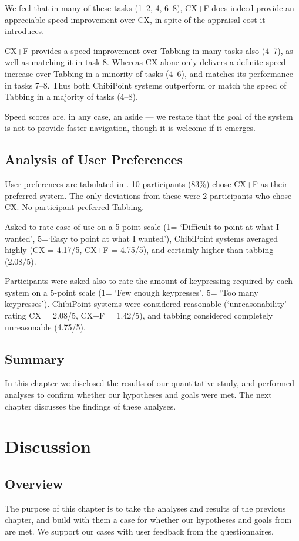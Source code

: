 \documentclass[11pt,openright,a4paper]{report}
\begin{document}
We feel that in many of these tasks (1--2, 4, 6--8), CX+F does indeed provide an appreciable speed improvement over CX, in spite of the appraisal cost it introduces.

CX+F provides a speed improvement over Tabbing in many tasks also (4--7), as well as matching it in task 8. Whereas CX alone only delivers a definite speed increase over Tabbing in a minority of tasks (4--6), and matches its performance in tasks 7--8. Thus both ChibiPoint systems outperform or match the speed of Tabbing in a majority of tasks (4--8).

Speed scores are, in any case, an aside --- we restate that the goal of the system is not to provide faster navigation, though it is welcome if it emerges.

\section{Analysis of User Preferences}
\label{sec:userpref}
User preferences are tabulated in . 10 participants (83\%) chose CX+F as their preferred system. The only deviations from these were 2 participants who chose CX. No participant preferred Tabbing.

Asked to rate ease of use on a 5-point scale (1= `Difficult to point at what I wanted', 5=`Easy to point at what I wanted'), ChibiPoint systems averaged highly (CX = 4.17/5, CX+F = 4.75/5), and certainly higher than tabbing (2.08/5).

Participants were asked also to rate the amount of keypressing required by each system on a 5-point scale (1= `Few enough keypresses', 5= `Too many keypresses'). ChibiPoint systems were considered reasonable (`unreasonability' rating CX = 2.08/5, CX+F = 1.42/5), and tabbing considered completely unreasonable (4.75/5).

\section{Summary}
In this chapter we disclosed the results of our quantitative study, and performed analyses to confirm whether our hypotheses and goals were met. The next chapter discusses the findings of these analyses.

\chapter{Discussion}
\label{chap:discussion}
\section{Overview}
The purpose of this chapter is to take the analyses and results of the previous chapter, and build with them a case for whether our hypotheses and goals from  are met. We support our cases with user feedback from the questionnaires.
\end{document}
